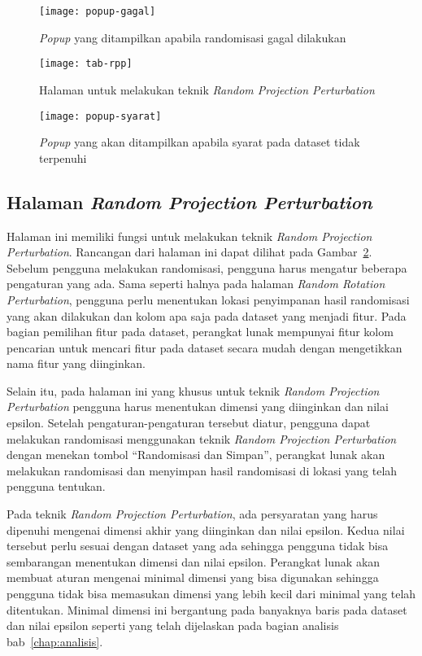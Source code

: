 \begin{figure}
	\centering
	\texttt{[image: popup-gagal]}
	\caption{\textit{Popup} yang ditampilkan apabila randomisasi gagal dilakukan}
	\label{fig:popup-gagal}
\end{figure}

\begin{figure}
	\centering
	\texttt{[image: tab-rpp]}
	\caption{Halaman untuk melakukan teknik \textit{Random Projection Perturbation}}
	\label{fig:tab-rpp}
\end{figure}

\begin{figure}
	\centering
	\texttt{[image: popup-syarat]}
	\caption{\textit{Popup} yang akan ditampilkan apabila syarat pada dataset tidak terpenuhi}
	\label{fig:popup-syarat}
\end{figure}

\subsection{Halaman \textit{Random Projection Perturbation}}
\label{subsec:tabrpp}

Halaman ini memiliki fungsi untuk melakukan teknik \textit{Random Projection Perturbation}. Rancangan dari halaman ini dapat dilihat pada Gambar~\ref{fig:tab-rpp}. Sebelum pengguna melakukan randomisasi, pengguna harus mengatur beberapa pengaturan yang ada. Sama seperti halnya pada halaman \textit{Random Rotation Perturbation}, pengguna perlu menentukan lokasi penyimpanan hasil randomisasi yang akan dilakukan dan kolom apa saja pada dataset yang menjadi fitur. Pada bagian pemilihan fitur pada dataset, perangkat lunak mempunyai fitur kolom pencarian untuk mencari fitur pada dataset secara mudah dengan mengetikkan nama fitur yang diinginkan.

Selain itu, pada halaman ini yang khusus untuk teknik \textit{Random Projection Perturbation} pengguna harus menentukan dimensi yang diinginkan dan nilai epsilon. Setelah pengaturan-pengaturan tersebut diatur, pengguna dapat melakukan randomisasi menggunakan teknik \textit{Random Projection Perturbation} dengan menekan tombol \textquotedblleft Randomisasi dan Simpan\textquotedblright, perangkat lunak akan melakukan randomisasi dan menyimpan hasil randomisasi di lokasi yang telah pengguna tentukan. 

Pada teknik \textit{Random Projection Perturbation}, ada persyaratan yang harus dipenuhi mengenai dimensi akhir yang diinginkan dan nilai epsilon. Kedua nilai tersebut perlu sesuai dengan dataset yang ada sehingga pengguna tidak bisa sembarangan menentukan dimensi dan nilai epsilon. Perangkat lunak akan membuat aturan mengenai minimal dimensi yang bisa digunakan sehingga pengguna tidak bisa memasukan dimensi yang lebih kecil dari minimal yang telah ditentukan. Minimal dimensi ini bergantung pada banyaknya baris pada dataset dan nilai epsilon seperti yang telah dijelaskan pada bagian analisis bab~\ref{chap:analisis}.

